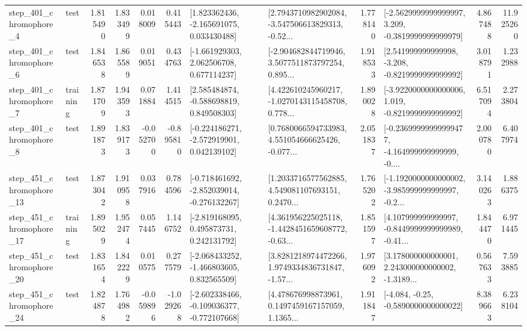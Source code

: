 \begin{tabular}{llrrrrllrlrr}
   step\_401\_chromophore\_4 &      test &      1.815490 &    1.833499 &      0.018009 &  0.415443 &    [1.823362436, -2.165691075, 0.033430488] &  [2.7943710982902084, -3.547506613829313, -0.52... &       1.778140 &  [-2.5629999999999997, 3.209, -0.3819999999999979] &            4.867488 &         11.925260 \\
   step\_401\_chromophore\_6 &      test &      1.846538 &    1.865589 &      0.019051 &  0.434763 &    [-1.661929303, 2.062506708, 0.677114237] &  [-2.904682844719946, 3.5077511873797254, 0.895... &       1.918533 &   [2.541999999999998, -3.208, -0.8219999999999992] &            3.018791 &          1.232988 \\
   step\_401\_chromophore\_7 &  training &      1.871709 &    1.943593 &      0.071884 &  1.414515 &    [2.585484874, -0.588698819, 0.849508303] &  [4.422610245960217, -1.0270143115458708, 0.778... &       1.890028 &  [-3.9220000000000006, 1.019, -0.8219999999999992] &            6.517094 &          2.273804 \\
   step\_401\_chromophore\_8 &      test &      1.891873 &    1.839173 &     -0.052700 & -0.895810 &   [-0.224186271, -2.572919901, 0.042139102] &  [0.7680066594733983, 4.551054666625426, -0.077... &       2.051837 &  [-0.23699999999999477, -4.164999999999999, -0.... &            2.000780 &          6.407974 \\
  step\_451\_chromophore\_13 &      test &      1.873042 &    1.910958 &      0.037916 &  0.784596 &  [-0.718461692, -2.852039014, -0.276132267] &  [1.2033716577562885, 4.549081107693151, 0.2470... &       1.765202 &  [-1.1920000000000002, -3.985999999999997, -0.2... &            3.140263 &          1.886375 \\
  step\_451\_chromophore\_17 &  training &      1.895029 &    1.952474 &      0.057445 &  1.146752 &    [-2.819168095, 0.495873731, 0.242131792] &  [4.361956225025118, -1.4428451659608772, -0.63... &       1.851597 &  [4.107999999999997, -0.8449999999999989, -0.41... &            1.844470 &          6.971445 \\
  step\_451\_chromophore\_20 &      test &      1.831654 &    1.842229 &      0.010575 &  0.277579 &   [-2.068433252, -1.466803605, 0.832565509] &  [3.8281218974472266, 1.9749334836731847, -1.57... &       1.976092 &  [3.178000000000001, 2.243000000000002, -1.3189... &            0.567633 &          7.593885 \\
  step\_451\_chromophore\_24 &      test &      1.824878 &    1.764982 &     -0.059896 & -1.029268 &  [-2.602338466, -0.109036377, -0.772107668] &  [4.478676998873961, 0.1497459167157059, 1.1365... &       1.911847 &               [-4.084, -0.25, -0.5890000000000022] &            8.389663 &          6.238104 \\

\end{tabular}
